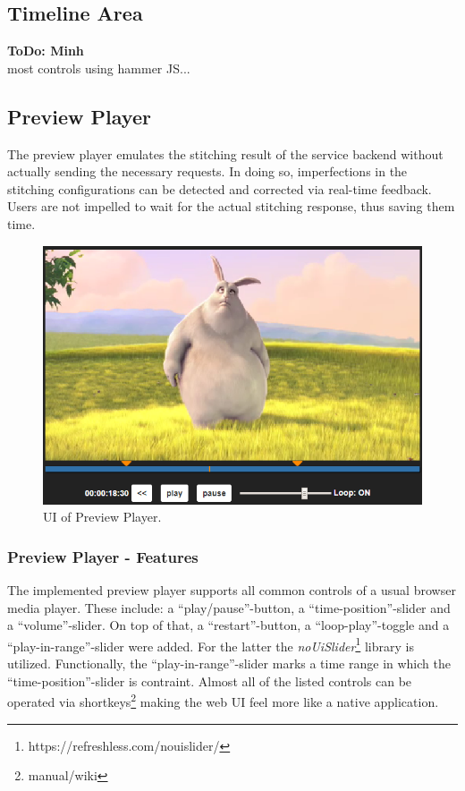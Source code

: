 \documentclass[conference]{IEEEtran}
\begin{document}
\subsection{Timeline Area}
\textbf{ToDo: Minh} \\
most controls using hammer JS...

\newpage

\subsection{Preview Player}
The preview player emulates the stitching result of the service backend without actually sending the necessary requests.
In doing so, imperfections in the stitching configurations can be detected and corrected via real-time feedback.
Users are not impelled to wait for the actual stitching response, thus saving them time.
\begin{figure}[H]
\centering
\includegraphics[scale=0.5]{preview_player.png}
\caption{UI of Preview Player.}
\end{figure}
\subsubsection{Preview Player - Features}
The implemented preview player supports all common controls of a usual browser media player.
These include: a ``play/pause''-button, a ``time-position''-slider and a ``volume''-slider.
On top of that, a ``restart''-button, a ``loop-play''-toggle and a ``play-in-range''-slider were added.
For the latter the \textit{noUiSlider}\footnote{https://refreshless.com/nouislider/} library is utilized.
Functionally, the ``play-in-range''-slider marks a time range in which the ``time-position''-slider is contraint.
Almost all of the listed controls can be operated via shortkeys\footnote{manual/wiki} making the web UI feel more like a native application.
\\
\end{document}
